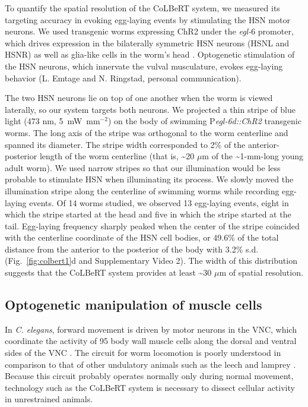 To quantify the spatial resolution of the CoLBeRT system, we measured its targeting accuracy in evoking egg-laying events by stimulating the HSN motor neurons. We used transgenic worms expressing ChR2 under the \textit{egl-$6$} promoter, which drives expression in the bilaterally symmetric HSN neurons (HSNL and HSNR) as well as glia-like cells in the worm's head  \citep{ringstad_fmrfamide_2008}. Optogenetic stimulation of the HSN neurons, which innervate the vulval musculature, evokes egg-laying behavior (L. Emtage and N. Ringstad, personal communication).

The two HSN neurons lie on top of one another when the worm is viewed laterally, so our system targets both neurons. We projected a thin stripe of blue light (473 nm, 5~mW~mm$^{-2}$) on the body of swimming P\textit{egl-6d::ChR2} transgenic worms. The long axis of the stripe was orthogonal to the worm centerline and spanned its diameter. The stripe width corresponded to 2\% of the anterior-posterior length of the worm centerline (that is, \textasciitilde20 $\mu$m of the \textasciitilde1-mm-long young adult worm). We used narrow stripes so that our illumination would be less probable to stimulate HSN when illuminating its process. We slowly moved the illumination stripe along the centerline of swimming worms while recording egg-laying events. Of 14 worms studied, we observed 13 egg-laying events, eight in which the stripe started at the head and five in which the stripe started at the tail. Egg-laying frequency sharply peaked when the center of the stripe coincided with the centerline coordinate of the HSN cell bodies, or 49.6\% of the total distance from the anterior to the posterior of the body with 3.2\% s.d. (Fig.~\ref{fig:colbert1}d and Supplementary Video 2). The width of this distribution suggests that the CoLBeRT system provides at least \textasciitilde30 $\mu$m of spatial resolution.


\subsection{Optogenetic manipulation of muscle cells}
In \textit{C. elegans}, forward movement is driven by motor neurons in the VNC, which coordinate the activity of 95 body wall muscle cells along the dorsal and ventral sides of the VNC \citep{von_stetina_motor_2006}. The circuit for worm locomotion is poorly understood in comparison to that of other undulatory animals such as the leech and lamprey \citep{marder_principles_1996, bryden_neural_2008, karbowski_systems_2008}. Because this circuit probably operates normally only during normal movement, technology such as the CoLBeRT system is necessary to dissect cellular activity in unrestrained animals.

